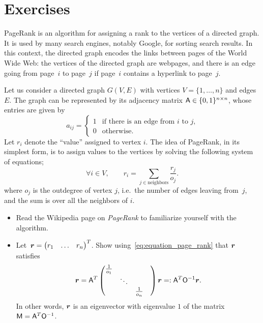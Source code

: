 \section{Exercises}
\begin{exercise}
    PageRank is an algorithm for assigning a rank to the vertices of a directed graph.
    It is used by many search engines, notably Google,
    for sorting search results.
    In this context,
    the directed graph encodes the links between pages of the World Wide Web:
    the vertices of the directed graph are webpages,
    and there is an edge going from page~$i$ to page~$j$ if page~$i$ contains a hyperlink to page~$j$.

    Let us consider a directed graph $G(V, E)$ with vertices $V = \{1, \dotsc, n\}$ and edges $E$.
    The graph can be represented by its adjacency matrix $\mathsf A \in \{0, 1\}^{n \times n}$,
    whose entries are given by
    \[
        a_{ij} =
        \begin{cases}
            1 & \text{if there is an edge from $i$ to $j$,} \\
            0 & \text{otherwise.}
        \end{cases}
    \]
    Let $r_i$ denote the ``value'' assigned to vertex $i$.
    The idea of PageRank, in its simplest form,
    is to assign values to the vertices
    by solving the following system of equations;
    \begin{equation}
        \label{eq:equation_page_rank}
        \forall i \in V, \qquad
        r_i
        = \sum_{j \in \text{neighbors}} \frac{r_j}{o_j}.
    \end{equation}
    where $o_j$ is the outdegree of vertex $j$,
    i.e.\ the number of edges leaving from~$j$,
    and the sum is over all the neighbors of $i$.
    \begin{itemize}
        \item
            Read the Wikipedia page on \emph{PageRank} to familiarize yourself with the algorithm.

        \item
            Let~$\mathbf{\boldsymbol{r}} = \begin{pmatrix} r_1 & \hdots & r_n \end{pmatrix}^T$.
            Show using~\eqref{eq:equation_page_rank} that $\mathbf{\boldsymbol{r}}$ satisfies
            \[
                \mathbf{\boldsymbol{r}} =
                \mathsf A^T
                \begin{pmatrix}
                    \frac{1}{o_1} & & & \\
                                  & \ddots & \\
                                  & & \frac{1}{o_n}
                \end{pmatrix}
                \mathbf{\boldsymbol{r}} =:  \mathsf A^T \mathsf O^{-1} \mathbf{\boldsymbol{r}}.
            \]
            In other words, $\mathbf{\boldsymbol{r}}$ is an eigenvector with eigenvalue $1$ of the matrix $\mathsf M = \mathsf A^T \mathsf O^{-1}$.


\end{itemize}
\end{exercise}
